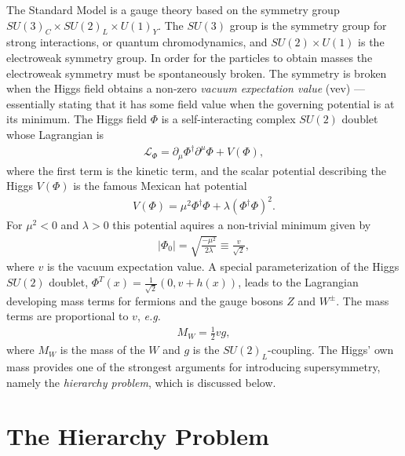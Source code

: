 \documentclass[twoside,english]{uiofysmaster}
\begin{document}
The Standard Model is a gauge theory based on the symmetry group $SU(3)_C \times SU(2)_L \times U(1)_Y$. The $SU(3)$ group is the symmetry group for strong interactions, or quantum chromodynamics, and $SU(2) \times U(1)$ is the electroweak symmetry group. In order for the particles to obtain masses the electroweak symmetry must be spontaneously broken. The symmetry is broken when the Higgs field obtains a non-zero \textit{vacuum expectation value} (vev) --- essentially stating that it has some field value when the governing potential is at its minimum. The Higgs field $\Phi$ is a self-interacting complex $SU(2)$ doublet whose Lagrangian is
\begin{align}
\mathcal{L}_{\Phi} = \partial_{\mu} \Phi^{\dagger} \partial^{\mu} \Phi + V(\Phi),
\end{align}
where the first term is the kinetic term, and the scalar potential describing the Higgs $V(\Phi)$ is the famous Mexican hat potential
\begin{align}
V(\Phi) = \mu^2 \Phi^{\dagger} \Phi + \lambda (\Phi^{\dagger} \Phi)^2.
\end{align}
For $\mu^2 < 0$ and $\lambda > 0$ this potential aquires a non-trivial minimum given by
\begin{align}
|\Phi_0| = \sqrt{\frac{-\mu^2}{2\lambda}} \equiv \frac{v}{\sqrt{2}},
\end{align}
where $v$ is the vacuum expectation value. A special parameterization of the Higgs $SU(2)$ doublet, $\Phi^T(x) = \frac{1}{\sqrt{2}} (0, v + h(x))$, leads to the Lagrangian developing mass terms for fermions and the gauge bosons $Z$ and $W^{\pm}$. The mass terms are proportional to $v$, \textit{e.g.}
\begin{align*}
M_W = \frac{1}{2} v g,
\end{align*}
where $M_W$ is the mass of the $W$ and $g$ is the $SU(2)_L$-coupling. The Higgs' own mass provides one of the strongest arguments for introducing supersymmetry, namely the \textit{hierarchy problem}, which is discussed below.

\section{The Hierarchy Problem}
\end{document}
